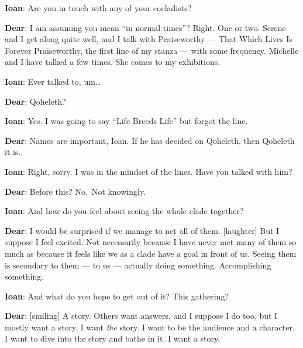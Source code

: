 \textbf{Ioan}: Are you in touch with any of your cocladists?

\textbf{Dear}: I am assuming you mean ``in normal times''? Right. One or two. Serene and I get along quite well, and I talk with Praiseworthy — That Which Lives Is Forever Praiseworthy, the first line of my stanza — with some frequency. Michelle and I have talked a few times. She comes to my exhibitions.

\textbf{Ioan}: Ever talked to, um\ldots{}

\textbf{Dear}: Qoheleth?

\textbf{Ioan}: Yes. I was going to say ``Life Breeds Life'' but forgot the line.

\textbf{Dear}: Names are important, Ioan. If he has decided on Qoheleth, then Qoheleth it is.

\textbf{Ioan}: Right, sorry. I was in the mindset of the lines. Have you talked with him?

\textbf{Dear}: Before this? No.~Not knowingly.

\textbf{Ioan}: And how do you feel about seeing the whole clade together?

\textbf{Dear}: I would be surprised if we manage to net all of them. {[}laughter{]} But I suppose I feel excited. Not necessarily because I have never met many of them so much as because it feels like we as a clade have a goal in front of us. Seeing them is secondary to them — to us — actually doing something. Accomplishing something.

\textbf{Ioan}: And what do you hope to get out of it? This gathering?

\textbf{Dear}: {[}smiling{]} A story. Others want answers, and I suppose I do too, but I mostly want a story. I want \emph{the} story. I want to be the audience and a character. I want to dive into the story and bathe in it. I want a story.
